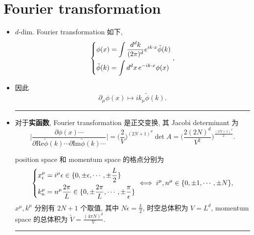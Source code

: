 \section{Fourier transformation}
\begin{itemize}
	\item $d$-dim. Fourier transformation 如下,
	\begin{equation} \label{A.2.1}
		\begin{dcases}
			\phi(x) = \int \frac{d^d k}{(2 \pi)^d} e^{i k \cdot x} \tilde{\phi}(k) \\
			\tilde{\phi}(k) = \int d^d x \, e^{- i k \cdot x} \phi(x)
		\end{dcases},
	\end{equation}
	
	\item 因此
	\begin{equation}
		\partial_\mu \phi(x) \mapsto i k_\mu \tilde{\phi}(k).
	\end{equation}
	
	\noindent\rule[0.5ex]{\linewidth}{0.5pt} %
	
	\item 对于\textbf{实函数}, Fourier transformation 是正交变换, 其 Jacobi determinant 为
	\begin{equation} \label{A.2.3}
		\Big| \frac{\partial \phi(x) \cdots}{\partial \mathrm{Re} \tilde{\phi}(k) \cdots \partial \mathrm{Im} \tilde{\phi}(k) \cdots} \Big| = \Big( \frac{2}{V} \Big)^{(2 N + 1)^d} \det A = \Big( \frac{2 (2 N)^d}{V^2} \Big)^{\frac{(2 N + 1)^d}{2}}.
	\end{equation}
	
	\begin{tcolorbox}[title=proof:]
		position space 和 momentum space 的格点分别为
		\begin{equation}
			\begin{dcases}
				x_i^\mu = i^\mu \epsilon \in \{0, \pm \epsilon, \cdots, \pm \frac{L}{2}\} \\
				k_n^\mu = n^\mu \frac{2 \pi}{L} \in \{0, \pm \frac{2 \pi}{L}, \cdots, \pm \frac{\pi}{\epsilon}\}
			\end{dcases} \iff i^\mu, n^\mu \in \{0, \pm 1, \cdots, \pm N\},
		\end{equation}
		$x^\mu, k^\mu$ 分别有 $2 N + 1$ 个取值, 其中 $N \epsilon = \frac{L}{2}$, 时空总体积为 $V = L^d$, momentum space 的总体积为 $\tilde{V} = \frac{(4 \pi N)^d}{V}$.
		
		\noindent\rule[0.5ex]{\linewidth}{0.5pt} %
		

\end{tcolorbox}
\end{itemize}
